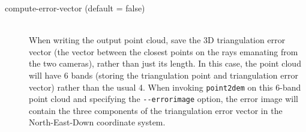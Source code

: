 \begin{description}
\item[compute-error-vector \textnormal (default = false)] \hfill \\

When writing the output point cloud, save the 3D triangulation error
vector (the vector between the closest points on the rays emanating from
the two cameras), rather than just its length. In this case, the point
cloud will have 6 bands (storing the triangulation point and
triangulation error vector) rather than the usual 4. When invoking
\texttt{point2dem} on this 6-band point cloud and specifying the
\texttt{-\/-errorimage} option, the error image will contain the three
components of the triangulation error vector in the North-East-Down
coordinate system.

\end{description}
